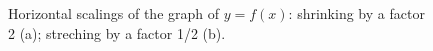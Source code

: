 \begin{figure}[h]
\centering
\centerline{
\hspace{0.1cm}
}
\caption{Horizontal scalings of the graph of $y=f(x)$: shrinking by a factor 2 (a);  streching by a factor 1/2 (b). }
\end{figure}
\pagebreak


